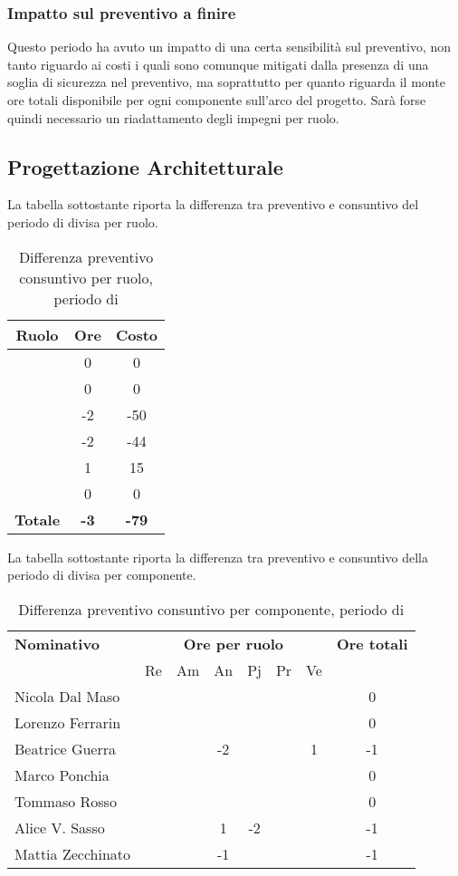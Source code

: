 \subsubsection{Impatto sul preventivo a finire}
Questo periodo ha avuto un impatto di una certa sensibilità sul preventivo, non tanto riguardo ai costi i quali sono comunque mitigati dalla presenza di una soglia di sicurezza nel preventivo, ma soprattutto per quanto riguarda il monte ore totali disponibile per ogni componente sull'arco del progetto. Sarà forse quindi necessario un riadattamento degli impegni per ruolo.

\subsection{Progettazione Architetturale}
La tabella sottostante riporta la differenza tra preventivo e consuntivo del periodo di \PA{} divisa per ruolo.
\begin{table}[H]
	\centering
	\begin{tabular}{|c|c|c|}
		\hline
		\textbf{Ruolo} &
		\textbf{Ore} &
		\textbf{Costo} \\
		\hline
		\Responsabile & 0 & 0\\
		\hline
		\Amministratore & 0 & 0\\
		\hline
		\Analista & -2 & -50\\
		\hline
		\Progettista & -2 & -44 \\
		\hline
		\Verificatore & 1 & 15 \\
		\hline
		\Programmatore & 0 & 0 \\
		\hline
		\textbf{Totale} & \textbf{-3} & \textbf{-79} \\
		\hline
	\end{tabular}
	\caption{Differenza preventivo consuntivo per ruolo, periodo di \PA}
\end{table}

La tabella sottostante riporta la differenza tra preventivo e consuntivo della periodo di \PA{} divisa per componente.
\begin{table}[H]
	\centering
	\begin{tabular}{|l|c|c|c|c|c|c|c|}
		\hline
		\textbf{Nominativo} & 
		\multicolumn{6}{c|}{\textbf{Ore per ruolo}} & 
		\textbf{Ore totali} \\
		& Re & Am & An & Pj & Pr & Ve & \\
		\hline
		Nicola Dal Maso & & & & & & & 0 \\
		Lorenzo Ferrarin & & & & & & & 0 \\
		Beatrice Guerra & & & -2& & & 1& -1 \\
		Marco Ponchia & & & & & & & 0 \\
		Tommaso Rosso & & & & & & & 0 \\
		Alice V. Sasso & & & 1& -2& & & -1 \\
		Mattia Zecchinato & & & -1& & & & -1 \\
		\hline
	\end{tabular}
	\caption{Differenza preventivo consuntivo per componente, periodo di \PA}
\end{table}
